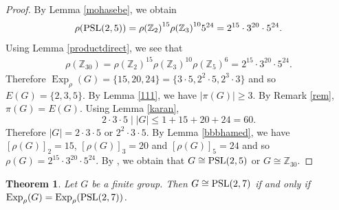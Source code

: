 \documentclass[12pt]{amsart}
\newtheorem{theorem}{Theorem}[section]
\theoremstyle{definition}
\begin{document}
	\begin{proof}
			By Lemma \ref{mohasebe}, we obtain 
		\begin{align*}
			\rho({\rm PSL}(2,5))={\rho(\mathbb{Z}_{2})}^{15} {\rho(\mathbb{Z}_{3})}^{10}  5^{24}=2^{15}\cdot3^{20}\cdot5^{24}.
		\end{align*}
	Using Lemma \ref{productdirect}, we see that
			\begin{align*}
		\rho(\mathbb{Z}_{30})={\rho(\mathbb{Z}_{2})}^{15} {\rho(\mathbb{Z}_{3})}^{10} {\rho(\mathbb{Z}_{5})}^{6}=2^{15}\cdot3^{20}\cdot5^{24}.
	\end{align*}
		Therefore $ {\operatorname{Exp}}_{\rho}(G) =\{15,20,24\}=\{3 \cdot 5,2^2 \cdot 5, 2^3 \cdot3\}$ and so $E(G)=\{2, 3, 5\}$.
		By Lemma  \ref{111}, we have $|\pi(G)|\geqslant 3$.
By Remark \ref{rem}, $\pi(G)=E(G)$.
		Using Lemma \ref{karan},
		$$	2 \cdot 3 \cdot 5  \mid |G| \leq 1 + 15 + 20 + 24=60.$$
		Therefore $|G|=2 \cdot 3 \cdot 5$ or $2^2 \cdot 3 \cdot 5$.
 By Lemma \ref{bbbhamed},
		we have $[\rho(G)]_2=15$, $[\rho(G)]_3=20$ and $[\rho(G)]_5=24$  and so
		$\rho(G) = 2^{15}\cdot3^{20}\cdot5^{24}$.
		By \cite[Theorem 3]{baniMal}, we obtain that $G \cong {\rm PSL}(2,5)$ or $G \cong \mathbb{Z}_{30}$.
	\end{proof}
	\begin{theorem}
		Let $G$ be a finite group. Then
		$G \cong {\rm PSL}(2,7)$  if and only if  ${\operatorname{Exp}}_{\rho}(G) = {\operatorname{Exp}}_{\rho}({\rm PSL}(2,7))$.
	\end{theorem}
\end{document}
